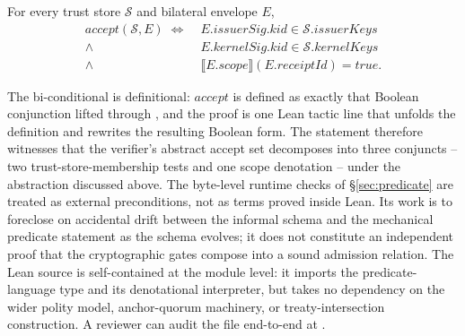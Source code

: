 \begin{theorem}
For every trust store $\mathcal{S}$ and bilateral envelope $E$,
\begin{align*}
  \mathit{accept}(\mathcal{S},E) \;\Longleftrightarrow\;
    & E.\mathit{issuerSig}.\mathit{kid} \in \mathcal{S}.\mathit{issuerKeys} \\
    {}\wedge{} & E.\mathit{kernelSig}.\mathit{kid} \in \mathcal{S}.\mathit{kernelKeys} \\
    {}\wedge{} & \llbracket E.\mathit{scope}\rrbracket(E.\mathit{receiptId}) = \mathit{true}.
\end{align*}
\end{theorem}

The bi-conditional is definitional: $\mathit{accept}$ is defined as exactly that Boolean conjunction lifted through , and the proof is one Lean tactic line that unfolds the definition and rewrites the resulting Boolean form. The statement therefore witnesses that the verifier's abstract accept set decomposes into three conjuncts -- two trust-store-membership tests and one scope denotation -- under the abstraction discussed above. The byte-level runtime checks of \S\ref{sec:predicate} are treated as external preconditions, not as terms proved inside Lean. Its work is to foreclose on accidental drift between the informal schema and the mechanical predicate statement as the schema evolves; it does not constitute an independent proof that the cryptographic gates compose into a sound admission relation. The Lean source is self-contained at the module level: it imports the predicate-language type and its denotational interpreter, but takes no dependency on the wider polity model, anchor-quorum machinery, or treaty-intersection construction. A reviewer can audit the file end-to-end at .

